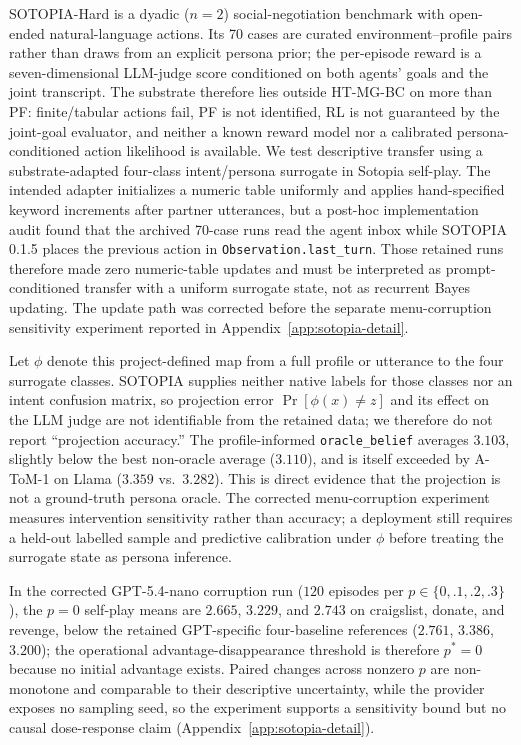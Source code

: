 \documentclass{article}
\begin{document}
SOTOPIA-Hard \citep{zhou2024sotopia} is a dyadic ($n=2$) social-negotiation benchmark with open-ended natural-language actions. Its 70 cases are curated environment--profile pairs rather than draws from an explicit persona prior; the per-episode reward is a seven-dimensional LLM-judge score conditioned on both agents' goals and the joint transcript. The substrate therefore lies outside HT-MG-BC on more than PF: finite/tabular actions fail, PF is not identified, RL is not guaranteed by the joint-goal evaluator, and neither a known reward model nor a calibrated persona-conditioned action likelihood is available. We test descriptive transfer using a substrate-adapted four-class intent/persona surrogate in Sotopia self-play. The intended adapter initializes a numeric table uniformly and applies hand-specified keyword increments after partner utterances, but a post-hoc implementation audit found that the archived 70-case runs read the agent inbox while SOTOPIA 0.1.5 places the previous action in \texttt{Observation.last\_turn}. Those retained runs therefore made zero numeric-table updates and must be interpreted as prompt-conditioned transfer with a uniform surrogate state, not as recurrent Bayes updating. The update path was corrected before the separate menu-corruption sensitivity experiment reported in Appendix~\ref{app:sotopia-detail}.

Let $\phi$ denote this project-defined map from a full profile or utterance to the four surrogate classes. SOTOPIA supplies neither native labels for those classes nor an intent confusion matrix, so projection error $\Pr[\phi(x)\neq z]$ and its effect on the LLM judge are not identifiable from the retained data; we therefore do not report ``projection accuracy.'' The profile-informed \texttt{oracle\_belief} averages $3.103$, slightly below the best non-oracle average ($3.110$), and is itself exceeded by A-ToM-1 on Llama ($3.359$ vs.\ $3.282$). This is direct evidence that the projection is not a ground-truth persona oracle. The corrected menu-corruption experiment measures intervention sensitivity rather than accuracy; a deployment still requires a held-out labelled sample and predictive calibration under $\phi$ before treating the surrogate state as persona inference.

In the corrected GPT-5.4-nano corruption run ($120$ episodes per $p\!\in\!\{0,.1,.2,.3\}$), the $p{=}0$ self-play means are $2.665$, $3.229$, and $2.743$ on craigslist, donate, and revenge, below the retained GPT-specific four-baseline references ($2.761$, $3.386$, $3.200$); the operational advantage-disappearance threshold is therefore $p^*{=}0$ because no initial advantage exists. Paired changes across nonzero $p$ are non-monotone and comparable to their descriptive uncertainty, while the provider exposes no sampling seed, so the experiment supports a sensitivity bound but no causal dose-response claim (Appendix~\ref{app:sotopia-detail}).
\end{document}
